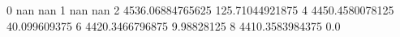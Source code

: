 0 nan nan
1 nan nan
2 4536.06884765625 125.71044921875
4 4450.4580078125 40.099609375
6 4420.3466796875 9.98828125
8 4410.3583984375 0.0
